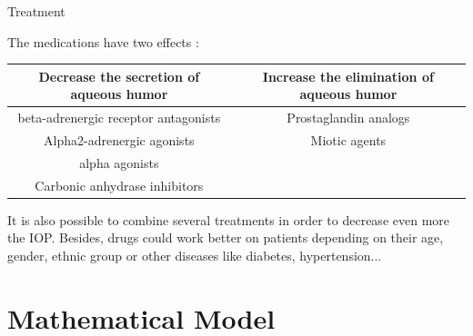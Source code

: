 \begin{frame}{Treatment}

The medications have two effects :
\newline
\\
\begin{tabular}{|c|c|}
\hline
Decrease the secretion of aqueous humor & Increase the elimination of aqueous humor\\
\hline
beta-adrenergic receptor antagonists & Prostaglandin analogs \\
Alpha2-adrenergic agonists & Miotic agents \\
alpha agonists &  \\
Carbonic anhydrase inhibitors &  \\
\hline
\end{tabular}
\newline
\newline
It is also possible to combine several treatments in order to decrease even more the IOP.
Besides, drugs could work better on patients depending on their age, gender, ethnic group or other diseases like diabetes, hypertension...

\end{frame}

\section{Mathematical Model}

